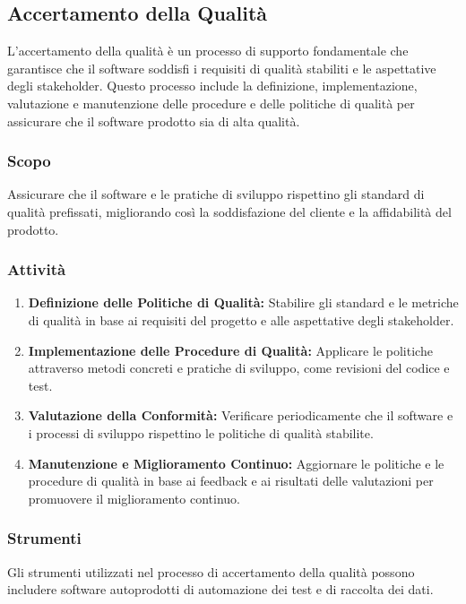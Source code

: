 \subsection{Accertamento della Qualità}

L'accertamento della qualità è un processo di supporto fondamentale che
garantisce che il software soddisfi i requisiti di qualità stabiliti e le
aspettative degli stakeholder.
Questo processo include la definizione, implementazione, valutazione e
manutenzione delle procedure e delle politiche di qualità per assicurare che
il software prodotto sia di alta qualità.

\subsubsection{Scopo}
Assicurare che il software e le pratiche di sviluppo rispettino gli standard
di qualità prefissati, migliorando così la soddisfazione del cliente e la
affidabilità del prodotto.

\subsubsection{Attività}
\begin{enumerate}
	\item \textbf{Definizione delle Politiche di Qualità:} Stabilire gli
	      standard e le metriche di qualità in base ai requisiti del progetto e
	      alle aspettative degli stakeholder.
	\item \textbf{Implementazione delle Procedure di Qualità:} Applicare le
	      politiche attraverso metodi concreti e pratiche di sviluppo, come
	      revisioni del codice e test.
	\item \textbf{Valutazione della Conformità:} Verificare periodicamente che
	      il software e i processi di sviluppo rispettino le politiche di
	      qualità stabilite.
	\item \textbf{Manutenzione e Miglioramento Continuo:} Aggiornare le
	      politiche e le procedure di qualità in base ai feedback e ai risultati
	      delle valutazioni per promuovere il miglioramento continuo.
\end{enumerate}

\subsubsection{Strumenti}
Gli strumenti utilizzati nel processo di accertamento della qualità possono
includere software autoprodotti di automazione dei test e di raccolta dei dati.
